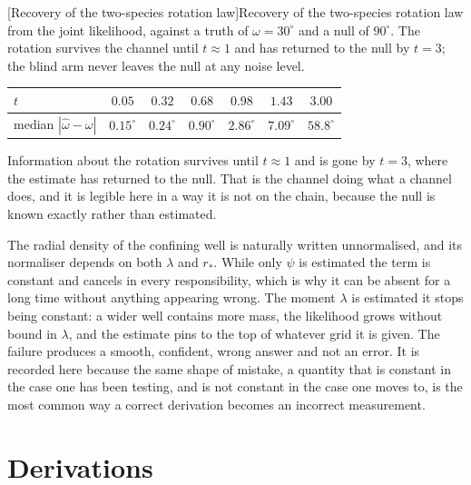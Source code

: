 \begin{center}
\begin{minipage}{\linewidth}\small\centering
{}[Recovery of the two-species rotation law]{Recovery of the two-species rotation law from the joint likelihood, against a truth of $\omega = 30^\circ$ and a null of $90^\circ$. The rotation survives the channel until $t \approx 1$ and has returned to the null by $t = 3$; the blind arm never leaves the null at any noise level.}
\label{tab:ring-recovery}
\begin{tabular}{@{}lcccccc@{}}
\toprule
$t$ & $0.05$ & $0.32$ & $0.68$ & $0.98$ & $1.43$ & $3.00$ \\
\midrule
median $|\hat\omega - \omega|$ & $0.15^\circ$ & $0.24^\circ$ & $0.90^\circ$
& $2.86^\circ$ & $7.09^\circ$ & $58.8^\circ$ \\
\bottomrule
\end{tabular}
\end{minipage}
\end{center}

Information about the rotation survives until $t\approx1$ and is gone by
$t=3$, where the estimate has returned to the null. That is the channel doing
what a channel does, and it is legible here in a way it is not on the chain,
because the null is known exactly rather than estimated.

\begin{remark}
The radial density of the confining well is naturally written unnormalised,
and its normaliser depends on both $\lambda$ and $r_*$. While only $\psi$ is
estimated the term is constant and cancels in every responsibility, which
is why it can be absent for a long time without anything appearing wrong. The
moment $\lambda$ is estimated it stops being constant: a wider well contains
more mass, the likelihood grows without bound in $\lambda$, and the estimate
pins to the top of whatever grid it is given. The failure produces a smooth,
confident, wrong answer and not an error. It is recorded here because the
same shape of mistake, a quantity that is constant in the case one has been
testing, and is not constant in the case one moves to, is the most common
way a correct derivation becomes an incorrect measurement.
\end{remark}

\section{Derivations}\label{app:ring}\label{sec:ring-derivations}

